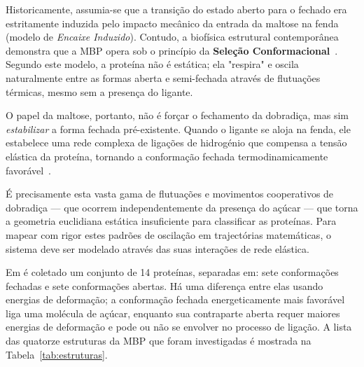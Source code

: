 \documentclass[12pt, a4paper]{article}
\begin{document}
Historicamente, assumia-se que a transição do estado aberto para o fechado era estritamente induzida pelo impacto mecânico da entrada da maltose na fenda (modelo de \textit{Encaixe Induzido}). Contudo, a biofísica estrutural contemporânea demonstra que a MBP opera sob o princípio da \textbf{Seleção Conformacional}~\cite{Seeliger2010}. Segundo este modelo, a proteína não é estática; ela "respira" e oscila naturalmente entre as formas aberta e semi-fechada através de flutuações térmicas, mesmo sem a presença do ligante. 

O papel da maltose, portanto, não é forçar o fechamento da dobradiça, mas sim \emph{estabilizar} a forma fechada pré-existente. Quando o ligante se aloja na fenda, ele estabelece uma rede complexa de ligações de hidrogénio que compensa a tensão elástica da proteína, tornando a conformação fechada termodinamicamente favorável~\cite{bucher2011}. 

É precisamente esta vasta gama de flutuações e movimentos cooperativos de dobradiça --- que ocorrem independentemente da presença do açúcar --- que torna a geometria euclidiana estática insuficiente para classificar as proteínas. Para mapear com rigor estes padrões de oscilação em trajectórias matemáticas, o sistema deve ser modelado através das suas interações de rede elástica.

Em \cite{kovacev2016} é coletado um conjunto de 14 proteínas, separadas em: sete conformações fechadas e sete conformações abertas. Há uma diferença entre elas usando energias de deformação; a conformação fechada energeticamente mais favorável liga uma molécula de açúcar, enquanto sua contraparte aberta requer maiores energias de deformação e pode ou não se envolver no processo de ligação. A lista das quatorze estruturas da MBP que foram investigadas é mostrada na Tabela~\ref{tab:estruturas}.
\end{document}
